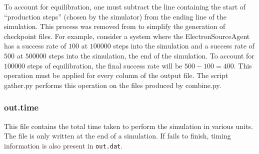         To account for equilibration, one must subtract the line containing
            the start of ``production steps'' (chosen by the simulator) from
            the ending line of the simulation.
        This process was removed from \Langmuir to simplify the generation of
            checkpoint files.
        For example, consider a system where the ElectronSourceAgent has a
            success rate of $100$ at $100000$ steps into the simulation and a
            success rate of $500$ at $500000$ steps into the simulation,
            the end of the simulation.
        To account for $100000$ steps of equilibration, the final success rate
            will be $500 - 100 = 400$.
        This operation must be applied for every column of the output file.
        The \LangmuirPython script gather.py performs this operation on
            the files produced by combine.py.
        
    \subsubsection{out.time}
        This file contains the total time taken to perform the simulation
            in various units.
        The file is only written at the end of a simulation.
        If \Langmuir fails to finish, timing information is also present
            in \texttt{out.dat}.

